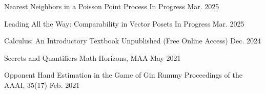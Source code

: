 


\vspace{0.7em}


\begin{cvitems}



\cvitemthree
  {Nearest Neighbors in a Poisson Point Process}
  {In Progress}
  {Mar. 2025}
  

\cvitemthree
  {Leading All the Way: Comparability in Vector Posets}
  {In Progress}
  {Mar. 2025}

\cvitemthree
  {Calculus: An Introductory Textbook}
  {Unpublished (Free Online Access)}
  {Dec. 2024}

  
  
\cvitemthree
  {Secrets and Quantifiers}
  {Math Horizons, MAA}
  {May 2021}


\cvitemthree
  {Opponent Hand Estimation in the Game of Gin Rummy}
  {Proceedings of the AAAI, 35(17)}
  {Feb. 2021}




  




\end{cvitems}

\vspace{0.7em}
